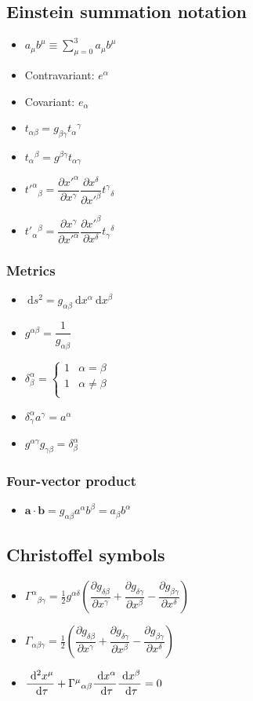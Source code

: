 \documentclass[]{report}
\newcommand \tab[1][1cm]{\hspace*{#1}}
\newcommand{\dn}[1]{\ \mathrm{d}#1}
\newcommand{\dd}[2]{ \dfrac{\dn #1}{\dn #2}}
\newcommand{\pp}[2]{\dfrac{\partial #1}{\partial #2}}
\newcommand{\itemt}{\item \tab}
\begin{document}
		\subsection{Einstein summation notation}
        
\begin{itemize}
\item \( a_\mu b^\mu \equiv \sum\limits^3_{\mu=0} a_\mu b^\mu \)
\item Contravariant: $e^\alpha$
\item Covariant: $e_\alpha$
\itemt \( t_{\alpha\beta} = g_{\beta\gamma} t_\alpha{}^\gamma \)
\itemt \( t_\alpha{}^\beta = g^{\beta\gamma} t_{\alpha\gamma} \)
\itemt \( t'^\alpha{}_\beta = \pp{x'^\alpha}{x^\gamma} \pp{x^\delta}{x'^\beta} t^\gamma{}_\delta\)
\itemt \( t'_\alpha{}^\beta = \pp{x^\gamma}{x'^\alpha} \pp{x'^\beta}{x^\delta} t_\gamma{}^\delta\)
\end{itemize}

\subsubsection{Metrics}
\begin{itemize}
\itemt \( \dn s^2 = g_{\alpha\beta} \dn x^\alpha \dn x^\beta \)
\itemt \( g^{\alpha\beta} = \dfrac{1}{g_{\alpha\beta}} \)
\itemt \( \delta^\alpha_\beta =
\begin{cases}
      1 & \alpha = \beta \\
      1	& \alpha \neq \beta \\
\end{cases}
\)
\itemt \( \delta^\alpha_\gamma a^\gamma = a^\alpha \)
\itemt \( g^{\alpha\gamma}g_{\gamma\beta} = \delta^\alpha_\beta \) %
\end{itemize}

\subsubsection{Four-vector product}
\begin{itemize}
\itemt \( \textbf{a}\cdot \textbf{b} = g_{\alpha\beta}a^\alpha b^\beta = a_\beta b^\alpha\)
\end{itemize}
        
		\subsection{Christoffel symbols}

\begin{itemize}
\itemt \( \Gamma^\alpha{}_{\beta\gamma} = \frac{1}{2} g^{\alpha\delta} (\pp{g_{\delta\beta}}{x^\gamma} + \pp{g_{\delta\gamma}}{x^\beta} - \pp{g_{\beta\gamma}}{x^\delta})  \) 

\itemt \( \Gamma_{\alpha\beta\gamma} = \frac{1}{2}(\pp{g_{\delta\beta}}{x^\gamma} + \pp{g_{\delta\gamma}}{x^\beta} - \pp{g_{\beta\gamma}}{x^\delta})  \) 

\itemt \( \dd{^2 x^\mu}{\tau} + \Gamma^\mu{}_{\alpha\beta} \dd{x^\alpha}{\tau} \dd{x^\beta}{\tau} = 0\)
\end{itemize}
\end{document}
